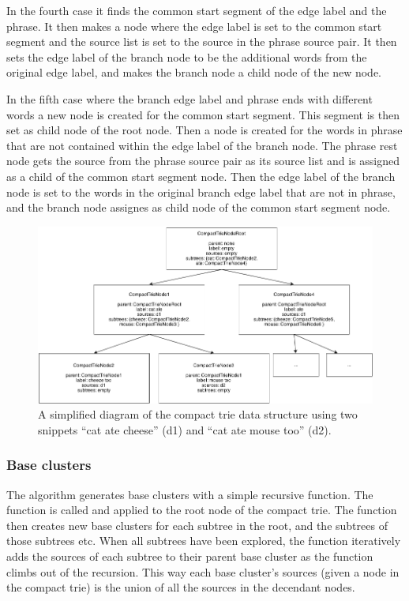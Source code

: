 In the fourth case it finds the common start segment of the edge label and the phrase. It then makes a node where the edge label is set to the common start segment and the source list is set to the source in the phrase source pair. It then sets the edge label of the branch node to be the additional words from the original edge label, and makes the branch node a child node of the new node.

In the fifth case where the branch edge label and phrase ends with different words a new node is created for the common start segment. This segment is then set as child node of the root node. Then a node is created for the words in phrase that are not contained within the edge label of the branch node. The phrase rest node gets the source from the phrase source pair as its source list and is assigned as a child of the common start segment node. Then the edge label of the branch node is set to the words in the original branch edge label that are not in phrase, and the branch node assignes as child node of the common start segment node.

\begin{figure}[!ht]
  \begin{center}
    \includegraphics[totalheight=0.3\textheight]{Figures/compacttriedatastructure}
  \end{center}
  \caption{A simplified diagram of the compact trie data structure using two snippets “cat ate cheese” (d1) and “cat ate mouse too” (d2).}
  \label{fig:compacttriedatastructure}
\end{figure}

\subsubsection{Base clusters}

The \CTC algorithm generates base clusters with a simple recursive function. The function is called and applied to the root node of the compact trie. The function then creates new base clusters for each subtree in the root, and the subtrees of those subtrees etc. When all subtrees have been explored, the function iteratively adds the sources of each subtree to their parent base cluster as the function climbs out of the recursion. This way each base cluster's sources (given a node in the compact trie) is the union of all the sources in the decendant nodes.

